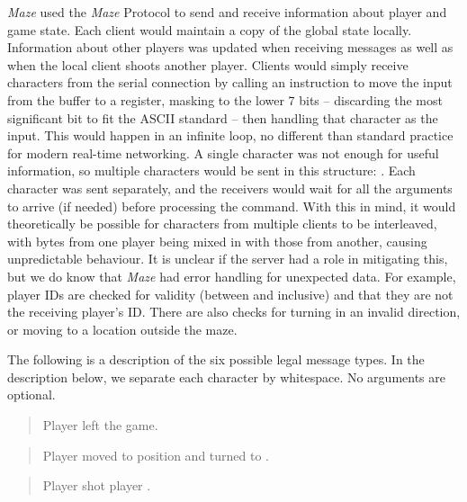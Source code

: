 \textit{Maze} used the \textit{Maze} Protocol to send and receive information about player and game state. Each client would maintain a copy of the global state locally. Information about other players was updated when receiving messages as well as when the local client shoots another player. Clients would simply receive characters from the serial connection by calling an instruction to move the input from the buffer to a register, masking to the lower 7 bits -- discarding the most significant bit to fit the ASCII standard -- then handling that character as the input. This would happen in an infinite loop, no different than standard practice for modern real-time networking. A single character was not enough for useful information, so multiple characters would be sent in this structure: . Each character was sent separately, and the receivers would wait for all the arguments to arrive (if needed) before processing the command. With this in mind, it would theoretically be possible for characters from multiple clients to be interleaved, with bytes from one player being mixed in with those from another, causing unpredictable behaviour. It is unclear if the server had a role in mitigating this, but we do know that \textit{Maze} had error handling for unexpected data. For example, player IDs are checked for validity (between  and  inclusive) and that they are not the receiving player's ID. There are also checks for turning in an invalid direction, or moving to a location outside the maze.

The following is a description of the six possible legal message types. In the description below, we separate each character by whitespace. No arguments are optional. \cite{mazesrc}

\begin{quote}
    
    Player  left the game.
\end{quote}

\begin{quote}
    
    Player  moved to position  and turned to .
\end{quote}

\begin{quote}
    
    Player  shot player .
\end{quote}

